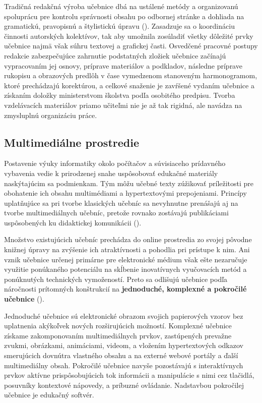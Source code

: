 Tradičná redakčná výroba učebnice dbá na ustálené metódy a organizovanú spoluprácu pre kontrolu správnosti obsahu po odbornej stránke a dohliada na gramatickú, pravopisnú a štylistickú úpravu (\cite{mlady_tvorba_1988}). Zasadzuje sa o koordináciu činnosti autorských kolektívov, tak aby umožnila zosúladiť všetky dôležité prvky učebnice najmä však súhru textovej a grafickej časti. Osvedčené pracovné postupy redakcie zabezpečujúce zahrnutie podstatných zložiek učebnice začínajú vypracovaním jej osnovy, príprave materiálov a podkladov, následne príprave rukopisu a obrazových predlôh v čase vymedzenom stanoveným harmonogramom, ktoré prechádzajú korektúrou, a celkové snaženie je zavŕšené vydaním učebnice a získaním doložky ministerstvom školstva podľa osobitého predpisu. Tvorba vzdelávacích materiálov priamo učiteľmi nie je až tak rigidná, ale navádza na zmysluplnú organizáciu práce.

\subsection{Multimediálne prostredie}
Postavenie výuky informatiky okolo počítačov a súvisiaceho prídavného vybavenia vedie k prirodzenej snahe uspôsobovať edukačné materiály naskýtajúcim sa podmienkam. Tým môžu učebné texty zúžikovať príležitosti pre obohatenie ich obsahu multimédiami a hypertextovými prepojeniami. Princípy uplatňujúce sa pri tvorbe klasických učebníc sa nevyhnutne prenášajú aj na tvorbe multimediálnych učebníc, pretože rovnako zostávajú publikáciami uspôsobených ku didaktickej komunikácii (\cite{krotky_nove_2015}).

Množstvo existujúcich učebníc prechádza do online prostredia zo svojej pôvodne knižnej úpravy na zvýšenie ich atraktívnosti a pohodlia pri prístupe k nim. Ani vznik učebnice určenej primárne pre elektronické médium však ešte nezaručuje využitie ponúkaného potenciálu na skĺbenie inovatívnych vyučovacích metód a ponúknutých technických vymožeností. Preto sa odlišujú učebnice podľa náročnosti prítomných konštrukcií na \textbf{jednoduché, komplexné a pokročilé učebnice} (\cite{krotky_nove_2015}).

Jednoduché učebnice sú elektronické obrazom svojich papierových vzorov bez uplatnenia akýkoľvek nových rozširujúcich možností. Komplexné učebnice získame zakomponovaním multimediálnych prvkov, zastúpených prevažne zvukmi, obrázkami, animáciami, videom, a vložením  hypertextových odkazov smerujúcich dovnútra vlastného obsahu a na externé webové portály a ďalší multimediálny obsah. Pokročilé učebnice navyše pozostávajú s interaktívnych prvkov aktívne prispôsobujúcich tok informácii a manipulácie s nimi cez tlačidlá, posuvníky kontextové nápovedy, a príbuzné ovládanie. Nadstavbou pokročilej učebnice je edukačný softvér.

